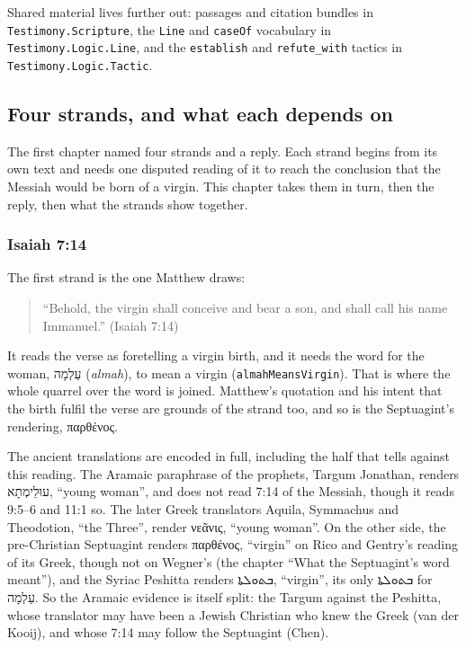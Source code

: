 \documentclass[11pt]{article}
\begin{document}
Shared material lives further out: passages and citation bundles in \texttt{Testimony.Scripture}, the \texttt{Line} and \texttt{case\allowbreak{}Of} vocabulary in \texttt{Testimony.Logic.Line}, and the \texttt{establish} and \texttt{refute\_\allowbreak{}with} tactics in \texttt{Testimony.Logic.Tactic}.

\subsection*{Four strands, and what each depends on}
The first chapter named four strands and a reply. Each strand begins from its own text and needs one disputed reading of it to reach the conclusion that the Messiah would be born of a virgin. This chapter takes them in turn, then the reply, then what the strands show together.

\subsubsection*{Isaiah 7:14}
The first strand is the one Matthew draws:

\begin{quote}
“Behold, the virgin shall conceive and bear a son, and shall call his name Immanuel.” (Isaiah 7:14)

\end{quote}
It reads the verse as foretelling a virgin birth, and it needs the word for the woman, עַלְמָה (\emph{almah}), to mean a virgin (\texttt{almah\allowbreak{}Means\allowbreak{}Virgin}). That is where the whole quarrel over the word is joined. Matthew’s quotation and his intent that the birth fulfil the verse are grounds of the strand too, and so is the Septuagint’s rendering, παρθένος.

The ancient translations are encoded in full, including the half that tells against this reading. The Aramaic paraphrase of the prophets, Targum Jonathan, renders עוּלֵימְתָא, “young woman”, and does not read 7:14 of the Messiah, though it reads 9:5–6 and 11:1 so. The later Greek translators Aquila, Symmachus and Theodotion, “the Three”, render νεᾶνις, “young woman”. On the other side, the pre-Christian Septuagint renders παρθένος, “virgin” on Rico and Gentry’s reading of its Greek, though not on Wegner’s (the chapter “What the Septuagint’s word meant”), and the Syriac Peshitta renders ܒܬܘܠܬܐ, “virgin”, its only ܒܬܘܠܬܐ for עַלְמָה. So the Aramaic evidence is itself split: the Targum against the Peshitta, whose translator may have been a Jewish Christian who knew the Greek (van der Kooij), and whose 7:14 may follow the Septuagint (Chen).
\end{document}
